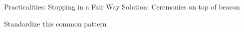\begin{frame}{Practicalities: Stopping in a Fair Way}
    \vspace{.7cm}
    \centering
    \pause
    Solution: Ceremonies on top of beacon

    \vspace{.3em}
    \pause
    Standardize this common pattern

\end{frame}


